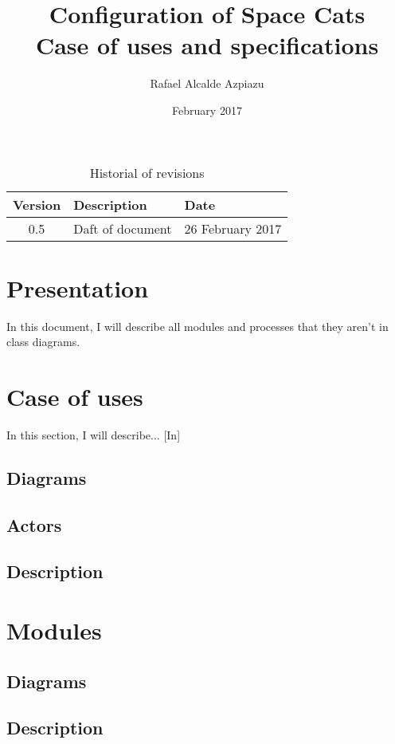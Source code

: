 \documentclass[12pt, english, a4paper]{article}
\title{Configuration of Space Cats \\ Case of uses and specifications}
\date{February 2017}
\author{Rafael Alcalde Azpiazu}
\begin{document}
\maketitle
\newpage

\tableofcontents
\newpage


\begin{table}
\caption{Historial of revisions}
\label{tab:historial}
\begin{tabularx}{\textwidth}{| c | X | l |}
\hline
Version & Description & Date \\ \hline
0.5 & Daft of document & 26 February 2017 \\ \hline
\end{tabularx}
\end{table}
\newpage

\section{Presentation}

In this document, I will describe all modules and processes that they aren't in class diagrams.

\section{Case of uses}

In this section, I will describe... [In]

\subsection{Diagrams}

\subsection{Actors}

\subsection{Description}

\section{Modules}

\subsection{Diagrams}

\subsection{Description}
\end{document}
